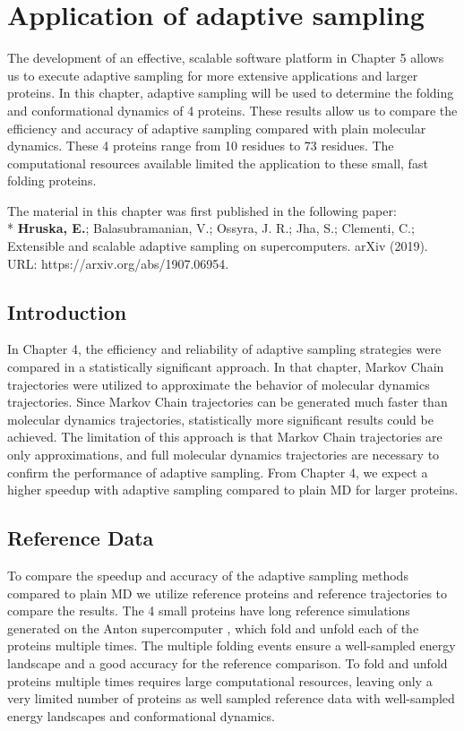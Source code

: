 \afterpage{\null\newpage}
\chapter{Application of adaptive sampling\label{ch:chapter5}}

The development of an effective, scalable software platform in Chapter 5 allows us to execute adaptive sampling for more extensive applications and larger proteins.
In this chapter, adaptive sampling will be used to determine the folding and conformational dynamics of 4 proteins. These results allow us to compare the efficiency and accuracy of adaptive sampling compared with plain molecular dynamics.  These 4 proteins range from 10 residues to 73 residues. The computational resources available limited the application to these small, fast folding proteins. 

The material in this chapter was first published in the following paper: 
\\*
\cite{Extasy2019} \textbf{Hruska, E.}; Balasubramanian, V.; Ossyra, J. R.; Jha, S.; Clementi, C.; Extensible
and scalable adaptive sampling on supercomputers. arXiv (2019). URL: https://arxiv.org/abs/1907.06954.


\section{\label{sec:intro5}Introduction}
  
In Chapter 4, the efficiency and reliability of adaptive sampling strategies were compared in a statistically significant approach. In that chapter, Markov Chain trajectories were utilized to approximate the behavior of molecular dynamics trajectories. Since Markov Chain trajectories can be generated much faster than molecular dynamics trajectories, statistically more significant results could be achieved. The limitation of this approach is that Markov Chain trajectories are only approximations, and full molecular dynamics trajectories are necessary to confirm the performance of adaptive sampling. From Chapter 4, we expect a higher speedup with adaptive sampling\cite{Adstrategies2018} compared to plain MD for larger proteins.

\section{\label{sec:Reference}Reference Data}



To compare the speedup and accuracy of the adaptive sampling methods compared to plain MD we utilize reference proteins and reference trajectories to compare the results.
The 4 small proteins have long reference simulations generated on the Anton supercomputer \cite{lindorff2011}, which fold and unfold each of the proteins multiple times. The multiple folding events ensure a well-sampled energy landscape and a good accuracy for the reference comparison. To fold and unfold proteins multiple times requires large computational resources, leaving only a very limited number of proteins as well sampled reference data with well-sampled energy landscapes and conformational dynamics.

